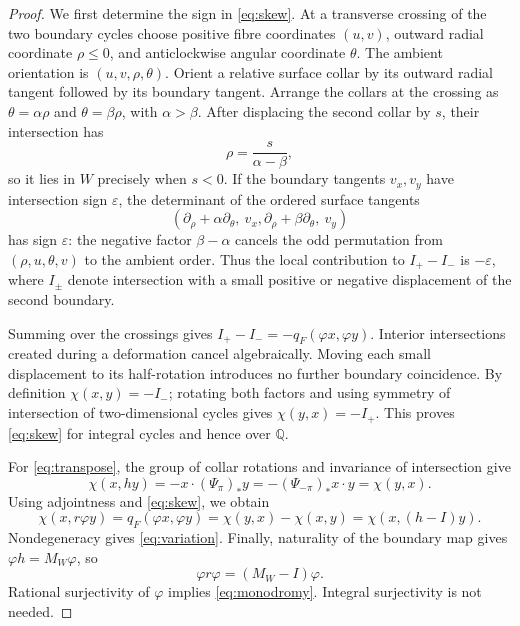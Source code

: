 \documentclass[11pt]{article}
\theoremstyle{definition}
\theoremstyle{remark}
\newcommand{\Q}{\mathbb Q}
\begin{document}

\begin{proof}
We first determine the sign in \eqref{eq:skew}. At a transverse crossing of the two boundary cycles choose positive fibre coordinates $(u,v)$, outward radial coordinate $\rho\leq0$, and anticlockwise angular coordinate $\theta$. The ambient orientation is $(u,v,\rho,\theta)$. Orient a relative surface collar by its outward radial tangent followed by its boundary tangent. Arrange the collars at the crossing as $\theta=\alpha\rho$ and $\theta=\beta\rho$, with $\alpha>\beta$. After displacing the second collar by $s$, their intersection has
\[
\rho=\frac{s}{\alpha-\beta},
\]
so it lies in $W$ precisely when $s<0$. If the boundary tangents $v_x,v_y$ have intersection sign $\varepsilon$, the determinant of the ordered surface tangents
\[
(\partial_\rho+\alpha\partial_\theta,\ v_x,
  \partial_\rho+\beta\partial_\theta,\ v_y)
\]
has sign $\varepsilon$: the negative factor $\beta-\alpha$ cancels the odd permutation from $(\rho,u,\theta,v)$ to the ambient order. Thus the local contribution to $I_+-I_-$ is $-\varepsilon$, where $I_\pm$ denote intersection with a small positive or negative displacement of the second boundary.

Summing over the crossings gives $I_+-I_-=-q_F(\varphi x,\varphi y)$. Interior intersections created during a deformation cancel algebraically. Moving each small displacement to its half-rotation introduces no further boundary coincidence. By definition $\chi(x,y)=-I_-$; rotating both factors and using symmetry of intersection of two-dimensional cycles gives $\chi(y,x)=-I_+$. This proves \eqref{eq:skew} for integral cycles and hence over $\Q$.

For \eqref{eq:transpose}, the group of collar rotations and invariance of intersection give
\[
\chi(x,hy)=-x\cdot(\Psi_{\pi})_*y
=- (\Psi_{-\pi})_*x\cdot y=\chi(y,x).
\]
Using adjointness and \eqref{eq:skew}, we obtain
\[
\chi(x,r\varphi y)=q_F(\varphi x,\varphi y)
=\chi(y,x)-\chi(x,y)=\chi(x,(h-I)y).
\]
Nondegeneracy gives \eqref{eq:variation}. Finally, naturality of the boundary map gives $\varphi h=M_W\varphi$, so
\[
\varphi r\varphi=(M_W-I)\varphi.
\]
Rational surjectivity of $\varphi$ implies \eqref{eq:monodromy}. Integral surjectivity is not needed.
\end{proof}
\end{document}
